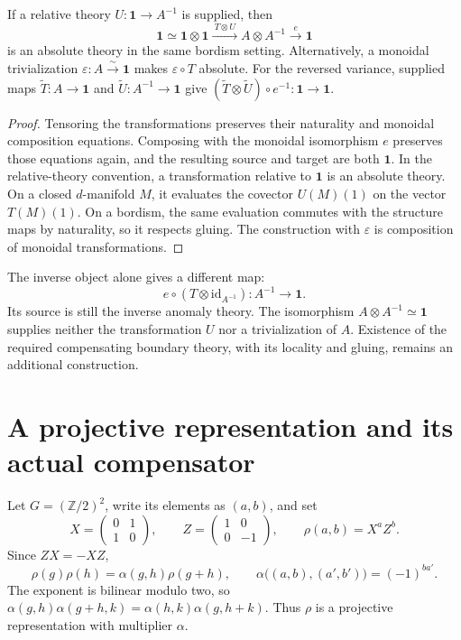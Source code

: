 \begin{theorem}\label{cbc:anomaly:relative-cancellation}
If a relative theory $U:\mathbf1\to A^{-1}$ is supplied, then
\[
 \mathbf1\simeq\mathbf1\otimes\mathbf1
 \xrightarrow{\ T\otimes U\ }A\otimes A^{-1}
 \xrightarrow{\ e\ }\mathbf1
\]
is an absolute theory in the same bordism setting.
Alternatively, a monoidal trivialization $\varepsilon:A\xrightarrow{\sim}\mathbf1$ makes $\varepsilon\circ T$ absolute.
For the reversed variance, supplied maps $\widetilde T:A\to\mathbf1$ and $\widetilde U:A^{-1}\to\mathbf1$ give $(\widetilde T\otimes\widetilde U)\circ e^{-1}:\mathbf1\to\mathbf1$.
\end{theorem}
\begin{proof}
Tensoring the transformations preserves their naturality and monoidal composition equations.
Composing with the monoidal isomorphism $e$ preserves those equations again, and the resulting source and target are both $\mathbf1$.
In the relative-theory convention, a transformation relative to $\mathbf1$ is an absolute theory.
On a closed $d$-manifold $M$, it evaluates the covector $U(M)(1)$ on the vector $T(M)(1)$.
On a bordism, the same evaluation commutes with the structure maps by naturality, so it respects gluing.
The construction with $\varepsilon$ is composition of monoidal transformations.
\end{proof}

The inverse object alone gives a different map:
\[
 e\circ(T\otimes\mathrm{id}_{A^{-1}}):A^{-1}\longrightarrow\mathbf1.
\]
Its source is still the inverse anomaly theory.
The isomorphism $A\otimes A^{-1}\simeq\mathbf1$ supplies neither the transformation $U$ nor a trivialization of $A$.
Existence of the required compensating boundary theory, with its locality and gluing, remains an additional construction.

\section{A projective representation and its actual compensator}

Let $G=(\mathbb Z/2)^2$, write its elements as $(a,b)$, and set
\[
 X=\begin{pmatrix}0&1\\1&0\end{pmatrix},\qquad
 Z=\begin{pmatrix}1&0\\0&-1\end{pmatrix},\qquad
 \rho(a,b)=X^aZ^b.
\]
Since $ZX=-XZ$,
\[
 \rho(g)\rho(h)=\alpha(g,h)\rho(g+h),
 \qquad \alpha\bigl((a,b),(a',b')\bigr)=(-1)^{ba'}.
\]
The exponent is bilinear modulo two, so $\alpha(g,h)\alpha(g+h,k)=\alpha(h,k)\alpha(g,h+k)$.
Thus $\rho$ is a projective representation with multiplier $\alpha$.

